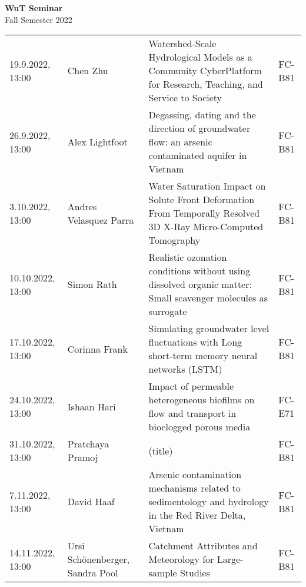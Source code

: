 \documentclass[12pt]{article}
\begin{document}
\centering

{\Huge \bf WuT Seminar}\\[1cm]
{\Large Fall Semester 2022}\\[1.8cm]





\renewcommand*\arraystretch{1.4}
\begin{tabular}{l p{3.8cm} p{8.5cm} p{2cm}}

19.9.2022, 13:00
 	& Chen Zhu
 	& Watershed-Scale Hydrological Models as a Community CyberPlatform for Research, Teaching, and Service to Society
  & FC-B81\\
  
26.9.2022, 13:00
 	& Alex Lightfoot
 	& Degassing, dating and the direction of groundwater flow: an arsenic contaminated aquifer in Vietnam
 	& FC-B81\\

3.10.2022, 13:00
 	& Andres Velasquez Parra
 	& Water Saturation Impact on Solute Front Deformation From Temporally Resolved 3D X-Ray Micro-Computed Tomography
 	& FC-B81\\

10.10.2022, 13:00
 	& Simon Rath
 	& Realistic ozonation conditions without using dissolved organic matter: Small scavenger molecules as surrogate
 	& FC-B81\\

17.10.2022, 13:00
 	& Corinna Frank
 	& Simulating groundwater level fluctuations with Long short-term memory neural networks (LSTM)
 	& FC-B81\\
 	
24.10.2022, 13:00
 	& Ishaan Hari
 	& Impact of permeable heterogeneous biofilms on flow and transport in bioclogged porous media
 	& FC-E71\\

31.10.2022, 13:00
 	& Pratchaya Pramoj
 	& (title)
 	& FC-B81\\

7.11.2022, 13:00
 	& David Haaf
 	& Arsenic contamination mechanisms related to sedimentology and hydrology in the Red River Delta, Vietnam
 	& FC-B81\\

14.11.2022, 13:00
 	& Ursi Schönenberger, Sandra Pool
 	& Catchment Attributes and Meteorology for Large-sample Studies
 	& FC-B81\\


\end{tabular}
\end{document}

